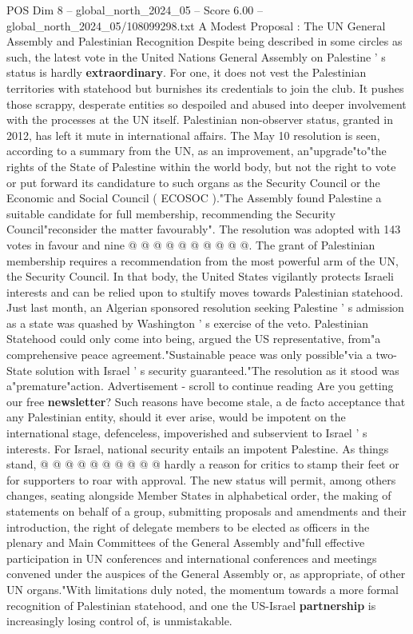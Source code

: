 \begin{textsample}{POS Dim 8 – global\_north\_2024\_05 – Score 6.00 – global\_north\_2024\_05/108099298.txt}  \label{ex:f8_pos_171}
A Modest Proposal : The UN General Assembly and Palestinian Recognition Despite being described in some circles as such, the latest vote in the United Nations General Assembly on Palestine ' s status is hardly \textbf{extraordinary}.
For one, it does not vest the Palestinian territories with statehood but burnishes its credentials to join the club.
It pushes those scrappy, desperate entities so despoiled and abused into deeper involvement with the processes at the UN itself.
Palestinian non-observer status, granted in 2012, has left it mute in international affairs.
The May 10 resolution is seen, according to a summary from the UN, as an improvement, an"upgrade"to"the rights of the State of Palestine within the world body, but not the right to vote or put forward its candidature to such organs as the Security Council or the Economic and Social Council ( ECOSOC )."The Assembly found Palestine a suitable candidate for full membership, recommending the Security Council"reconsider the matter favourably".
The resolution was adopted with 143 votes in favour and nine @ @ @ @ @ @ @ @ @ @.
The grant of Palestinian membership requires a recommendation from the most powerful arm of the UN, the Security Council.
In that body, the United States vigilantly protects Israeli interests and can be relied upon to stultify moves towards Palestinian statehood.
Just last month, an Algerian sponsored resolution seeking Palestine ' s admission as a state was quashed by Washington ' s exercise of the veto.
Palestinian Statehood could only come into being, argued the US representative, from"a comprehensive peace agreement."Sustainable peace was only possible"via a two-State solution with Israel ' s security guaranteed."The resolution as it stood was a"premature"action.
Advertisement - scroll to continue reading Are you getting our free \textbf{newsletter}?
Such reasons have become stale, a de facto acceptance that any Palestinian entity, should it ever arise, would be impotent on the international stage, defenceless, impoverished and subservient to Israel ' s interests.
For Israel, national security entails an impotent Palestine.
As things stand, @ @ @ @ @ @ @ @ @ @ hardly a reason for critics to stamp their feet or for supporters to roar with approval.
The new status will permit, among others changes, seating alongside Member States in alphabetical order, the making of statements on behalf of a group, submitting proposals and amendments and their introduction, the right of delegate members to be elected as officers in the plenary and Main Committees of the General Assembly and"full effective participation in UN conferences and international conferences and meetings convened under the auspices of the General Assembly or, as appropriate, of other UN organs."With limitations duly noted, the momentum towards a more formal recognition of Palestinian statehood, and one the US-Israel \textbf{partnership} is increasingly losing control of, is unmistakable.

\end{textsample}
